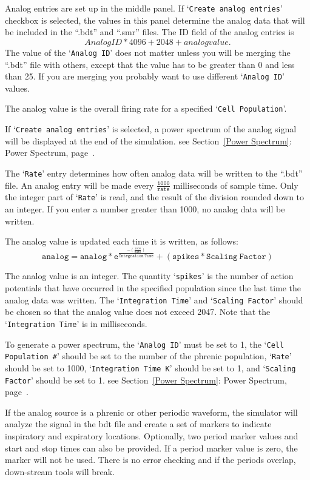 \documentclass[12pt,openany,oneside]{book}
\newcommand{\tmcode}[1]{\mathtt{#1}}
\newcommand{\tisamp}[1]{`\texttt{#1}'}
\newcommand{\tixref}[1]{see Section~\ref{#1}: #1, page~\pageref{#1}}
\newcommand{\ext}[1]{{{``.#1''}}}
\begin{document}
Analog entries are set up in the middle panel. If \tisamp{Create analog
entries} checkbox is selected, the values in this panel determine the
analog data that will be included in the \ext{bdt}  and \ext{smr} files.
The ID field of the analog entries is \[Analog ID * 4096 + 2048 + analog
value.\]  The value of the \tisamp{Analog ID} does not matter unless you
will be merging the \ext{bdt} file with others, except that the value has
to be greater than 0 and less than 25. If you are merging you probably
want to use different \tisamp{Analog ID} values.

The analog value is the overall firing rate for a specified \tisamp{Cell
Population}.

If \tisamp{Create analog entries} is selected, a power spectrum of the
analog signal will be displayed at the end of the simulation.
\tixref{Power Spectrum}.

The \tisamp{Rate} entry determines how often analog data will be written
to the \ext{bdt} file. An analog entry will be made every
$\tmcode{\tfrac{1000}{rate}}$ milliseconds of sample time. Only the integer
part of \tisamp{Rate} is read, and the result of the division rounded down
to an integer. If you enter a number greater than 1000, no analog data
will be written.

The analog value is updated each time it is written, as follows:
$$
\tmcode{ analog = analog * e^{\tfrac{-{\left (\tfrac{1000}{Rate}\right
)}}{Integration\ Time}} + (spikes * Scaling\ Factor)}
$$

The analog value is an integer. The
quantity \tisamp{spikes} is the number of action potentials that have
occurred in the specified population since the last time the analog
data was written. The \tisamp{Integration Time} and \tisamp{Scaling
Factor} should be chosen so that the analog value does not exceed
2047. Note that the \tisamp{Integration Time} is in milliseconds.

To generate a power spectrum, the \tisamp{Analog ID} must be set to 1,
the \tisamp{Cell Population \#} should be set to the number of the
phrenic population, \tisamp{Rate} should be set to 1000,
\tisamp{Integration Time K} should be set to 1, and \tisamp{Scaling
Factor} should be set to 1. \tixref{Power Spectrum}.

If the analog source is a phrenic or other periodic waveform, the
simulator will analyze the signal in the bdt file and create a set of
markers to indicate inspiratory and expiratory locations. Optionally, two
period marker values and start and stop times can also be provided.  If a
period marker value is zero, the marker will not be used.  There is no
error checking and if the periods overlap, down-stream tools will break.
\end{document}
